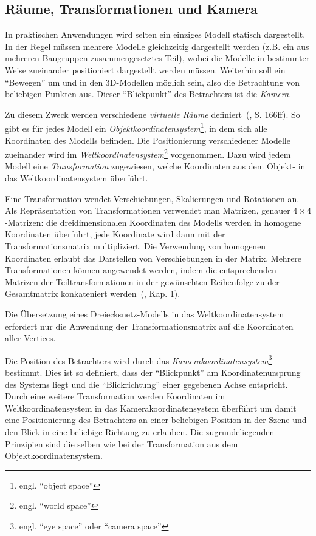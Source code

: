 \documentclass[twoside,a4paper,fleqn,12pt]{book}
\begin{document}

\subsection{Räume, Transformationen und Kamera}

In praktischen Anwendungen wird selten ein einziges Modell statisch dargestellt. In der Regel müssen mehrere Modelle
gleichzeitig dargestellt werden (z.B. ein aus mehreren Baugruppen zusammengesetztes Teil), wobei die Modelle
in bestimmter Weise zueinander positioniert dargestellt werden müssen. Weiterhin soll ein "`Bewegen"' um und in den 3D-Modellen
 möglich sein, also die Betrachtung von beliebigen Punkten aus. Dieser "`Blickpunkt"' des Betrachters ist die \emph{Kamera}.

Zu diesem Zweck werden verschiedene \emph{virtuelle Räume} definiert~(\cite{watt_de}, S. 166ff).
 So gibt es für jedes Modell ein \emph{Objektkoordinatensystem}\footnote{engl. ``object space''},
in dem sich alle Koordinaten des Modells befinden. 
Die Positionierung verschiedener Modelle zueinander wird im \emph{Weltkoordinatensystem}\footnote{engl. ``world space''} vorgenommen. 
Dazu wird jedem Modell eine \emph{Transformation} zugewiesen, welche Koordinaten aus dem Objekt- in das
Weltkoordinatensystem überführt. 

Eine Transformation wendet Verschiebungen, Skalierungen und Rotationen an. Als Repräsentation von Transformationen
verwendet man Matrizen, genauer $4 \times 4$-Matrizen: die dreidimensionalen Koordinaten des Modells werden
in homogene Koordinaten überführt, %
jede Koordinate wird dann mit der Transformationsmatrix multipliziert. Die Verwendung von homogenen Koordinaten
erlaubt das Darstellen von Verschiebungen in der Matrix. Mehrere Transformationen können angewendet werden, indem 
die entsprechenden Matrizen der Teiltransformationen in der gewünschten Reihenfolge zu der Gesamtmatrix konkateniert werden~(\cite{watt_de}, Kap. 1).

Die Übersetzung eines Dreiecksnetz-Modells in das Weltkoordinatensystem erfordert nur die Anwendung der Transformationsmatrix
auf die Koordinaten aller Vertices.

Die Position des Betrachters wird durch das \emph{Kamerakoordinatensystem}\footnote{engl. ``eye space'' oder ``camera space''}
 bestimmt. Dies ist so definiert, dass der "`Blickpunkt"' am Koordinatenursprung des Systems liegt
und die "`Blickrichtung"' einer gegebenen Achse entspricht. 
Durch eine weitere Transformation werden Koordinaten im Weltkoordinatensystem in das Kamerakoordinatensystem
überführt um damit eine Positionierung des Betrachters an einer beliebigen Position in der Szene und den Blick in eine beliebige Richtung zu erlauben.
Die zugrundeliegenden Prinzipien sind die selben wie bei der Transformation aus dem Objektkoordinatensystem.
\end{document}
